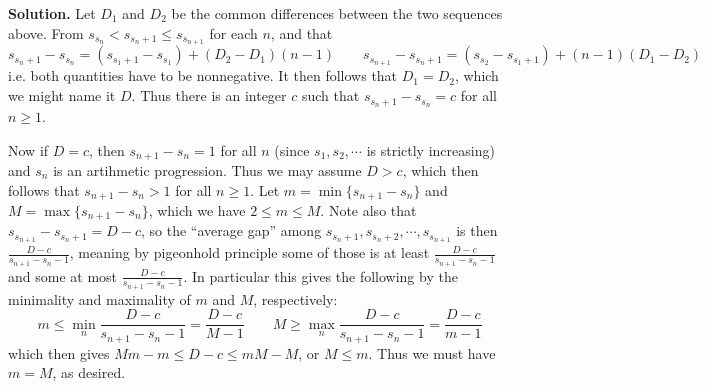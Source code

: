 \documentclass[11pt,a4paper]{article}
\begin{document}
\begin{enumerate}
		\textbf{Solution.} 
		Let $D_1$ and $D_2$ be the common differences between the two sequences above. 
		From $s_{s_n} < s_{s_n+1}\le s_{s_{n+1}}$ for each $n$, and that 
		\[
		 s_{s_n+1} - s_{s_n} = (s_{s_1+1} - s_{s_1}) + (D_2 - D_1)(n - 1)
		 \qquad 
		 s_{s_{n+1}} -  s_{s_n+1} = (s_{s_{2}} -  s_{s_1+1}) + (n - 1)(D_1 - D_2)
		\]
		i.e. both quantities have to be nonnegative. It then follows that $D_1=D_2$, which we might name it $D$. 
		Thus there is an integer $c$ such that $s_{s_n+1} - s_{s_n} = c$ for all $n\ge 1$. 
		
		Now if $D = c$, then $s_{n+1}-s_n = 1$ for all $n$ (since $s_1, s_2, \cdots$ is strictly increasing) and $s_n$ is an artihmetic progression. 
		Thus we may assume $D > c$, which then follows that $s_{n + 1} - s_n > 1$ for all $n\ge 1$. 
		Let $m=\min\{s_{n+1}-s_n\}$ and $M = \max\{s_{n+1}-s_n\}$, which we have $2\le m\le M$. 
		Note also that $s_{s_{n+1}} - s_{s_n + 1} = D - c$, 
		so the ``average gap'' among $s_{s_n+1}, s_{s_n+2}, \cdots, s_{s_{n+1}}$ is then 
		$\frac{D-c}{s_{n + 1} - s_n - 1}$, 
		meaning by pigeonhold principle some of those is at least $\frac{D-c}{s_{n + 1} - s_n - 1}$ and some at most $\frac{D-c}{s_{n + 1} - s_n - 1}$. 
		In particular this gives the following by the minimality and maximality of $m$ and $M$, respectively: 
		\[
		m\le \min_n \frac{D-c}{s_{n + 1} - s_n - 1} = \frac{D - c}{M - 1}
		\qquad 
		M\ge \max_n \frac{D-c}{s_{n + 1} - s_n - 1} = \frac{D - c}{m - 1}
		\]
		which then gives $Mm - m\le D - c \le mM - M$, or $M\le m$. 
		Thus we must have $m = M$, as desired. 
		
	\end{enumerate}
    
\end{document}
